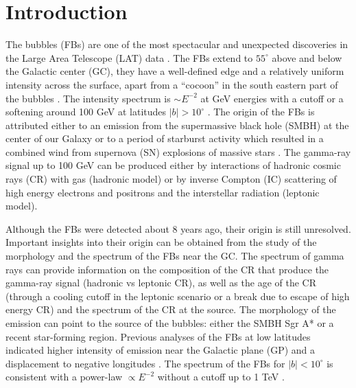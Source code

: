\section{Introduction}



The \Fermi bubbles (FBs) are one of the most spectacular and unexpected discoveries 
in the \Fermi Large Area Telescope (LAT) data \citep{2010ApJ...724.1044S}.
The FBs extend to $55^\circ$ above and below the Galactic center (GC),
they have a well-defined edge and a relatively uniform intensity across the surface, apart from a ``cocoon'' in the south eastern part of the bubbles
\citep{2012ApJ...753...61S, 2014ApJ...793...64A}.
The intensity spectrum is $\sim E^{-2}$ at GeV energies with a cutoff or a softening around 100 GeV at latitudes $|b| > 10^\circ$ \citep{2014ApJ...793...64A}.
The origin of the FBs is attributed either to an emission from the supermassive black hole (SMBH) at
the center of our Galaxy %
or to a period of starburst activity which resulted in a combined wind
from supernova (SN) explosions of massive stars %
\citep{2010ApJ...724.1044S}.
The gamma-ray signal up to 100 GeV can be produced either by interactions of hadronic cosmic rays (CR) with gas (hadronic model)
or by inverse Compton (IC) scattering of high energy electrons and positrons and the interstellar radiation (leptonic model).

Although the FBs were detected about 8 years ago, their origin is still unresolved.
Important insights into their origin can be obtained from the study of the morphology and the spectrum of the FBs near the GC.
The spectrum of gamma rays can provide information on the composition of the 
CR that produce the gamma-ray signal (hadronic vs leptonic CR),
as well as the age of the CR (through a cooling cutoff in the leptonic scenario or a break due to escape of high energy CR)
and the spectrum of the CR at the source.
The morphology of the emission can point to the source of the bubbles: either the SMBH Sgr A* or a recent star-forming region.
Previous analyses of the FBs at low latitudes indicated higher intensity of emission near the Galactic plane (GP) and a displacement
to negative longitudes \citep{2016ApJS..223...26A, 2017ApJ...840...43A, 2017JCAP...08..022S}.
The spectrum of the FBs for $|b| < 10^\circ$ is consistent with a power-law $\propto E^{-2}$ 
without a cutoff up to 1 TeV \citep{2017ApJ...840...43A}.

